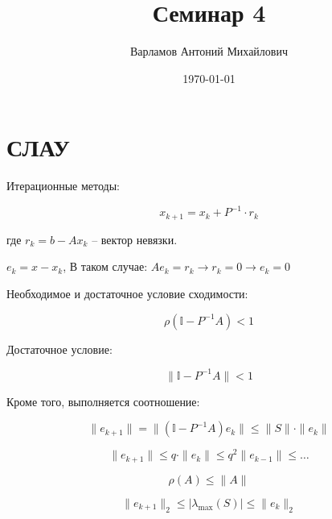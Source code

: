 \documentclass[10pt,a4paper]{article}
\title{Семинар 4}
\date{\today}
\author{Варламов Антоний Михайлович}
\begin{document}
	
	\maketitle	
	
	\section{СЛАУ}
	
		Итерационные методы:
		
		\begin{equation}
			x_{k + 1} = x_{k} + P^{-1}\cdot r_{k}
		\end{equation}
		
		где $r_{k} = b - Ax_{k}$ -- вектор невязки.
		
		$e_{k} = x - x_{k}$, В таком случае: $Ae_{k} = r_{k} \rightarrow r_{k}
		= 0 \rightarrow e_{k} = 0$
		
		Необходимое и достаточное условие сходимости:
		
		\begin{equation}
			\rho\left(\mathbb{I} - P^{-1}A\right) < 1
		\end{equation}
		
		Достаточное условие:
		
		\begin{equation}
			\parallel \mathbb{I} - P^{-1}A \parallel < 1
		\end{equation}
		
		Кроме того, выполняется соотношение:
		
		\begin{equation}
			\parallel e_{k + 1} \parallel = \parallel 
			\left(\mathbb{I} - P^{-1}A\right)e_{k}\parallel \leqslant
			\parallel S \parallel \cdot \parallel e_{k} \parallel 
		\end{equation}
		
		\begin{equation}
			\parallel e_{k + 1} \parallel \leqslant q\cdot 
			\parallel e_{k} \parallel \leqslant q^{2} \parallel e_{k - 1}
			\parallel \leqslant \ldots
		\end{equation}
		
		\begin{equation}
			\rho\left(A\right) \leqslant \parallel A \parallel
		\end{equation}
		
		\begin{equation}
			\parallel e_{k + 1} \parallel_{2} \leqslant 
			\left|\lambda_{\max} \left(S \right)\right| \leqslant 
			\parallel e_{k} \parallel_{2}
		\end{equation}
		
\end{document}
